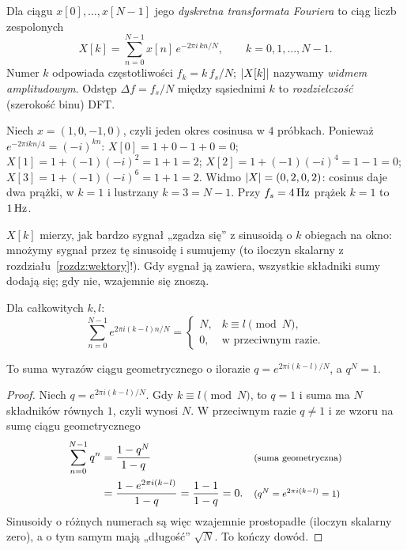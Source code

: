 \begin{definicja}[DFT]\label{def:dft}
Dla ciągu $x[0],\dots,x[N-1]$ jego \emph{dyskretna transformata Fouriera} to ciąg liczb zespolonych
\begin{equation}
  X[k]=\sum_{n=0}^{N-1}x[n]\,e^{-2\pi i\,kn/N},\qquad k=0,1,\dots,N-1.
  \label{eq:dft}
\end{equation}
Numer $k$ odpowiada częstotliwości $f_k=k\,f_s/N$; $\left\lvert X[k]\right\rvert$ nazywamy \emph{widmem amplitudowym}.
Odstęp $\Delta f=f_s/N$ między sąsiednimi $k$ to \emph{rozdzielczość} (szerokość binu) DFT.
\end{definicja}

\begin{przyklad}[$N=4$ ręcznie]\label{prz:dft4}
Niech $x=(1,0,-1,0)$, czyli jeden okres cosinusa w $4$ próbkach. Ponieważ $e^{-2\pi ikn/4}=(-i)^{kn}$:
$X[0]=1+0-1+0=0$; $X[1]=1+(-1)(-i)^{2}=1+1=2$; $X[2]=1+(-1)(-i)^{4}=1-1=0$; $X[3]=1+(-1)(-i)^{6}=1+1=2$.
Widmo $\left\lvert X\right\rvert=(0,2,0,2)$: cosinus daje dwa prążki, w $k=1$ i lustrzany $k=3=N-1$. Przy $f_s=4\,\mathrm{Hz}$ prążek $k=1$ to $1\,\mathrm{Hz}$.
\end{przyklad}

\begin{intuicja}
$X[k]$ mierzy, jak bardzo sygnał „zgadza się” z sinusoidą o $k$ obiegach na okno: mnożymy sygnał przez tę sinusoidę i
sumujemy (to iloczyn skalarny z rozdziału~\ref{rozdz:wektory}!). Gdy sygnał ją zawiera, wszystkie składniki sumy dodają się;
gdy nie, wzajemnie się znoszą.
\end{intuicja}

\begin{twierdzenie}\label{tw:ortogonalnosc}
Dla całkowitych $k,l$:
\begin{equation}
  \sum_{n=0}^{N-1}e^{2\pi i(k-l)n/N}=\begin{cases}N,&k\equiv l\pmod N,\\0,&\text{w przeciwnym razie.}\end{cases}
\end{equation}
\end{twierdzenie}
\begin{pomyslDowodu}
To suma wyrazów ciągu geometrycznego o ilorazie $q=e^{2\pi i(k-l)/N}$, a $q^N=1$.
\end{pomyslDowodu}
\begin{proof}
Niech $q=e^{2\pi i(k-l)/N}$. Gdy $k\equiv l\pmod N$, to $q=1$ i suma ma $N$ składników równych $1$, czyli wynosi $N$.
W przeciwnym razie $q\neq1$ i ze wzoru na sumę ciągu geometrycznego
\begin{align*}
\sum_{n=0}^{N-1}q^n &= \frac{1-q^N}{1-q} && \text{\footnotesize (suma geometryczna)}\\
 &= \frac{1-e^{2\pi i(k-l)}}{1-q}=\frac{1-1}{1-q}=0. && \text{\footnotesize ($q^N=e^{2\pi i(k-l)}=1$)}
\end{align*}
Sinusoidy o różnych numerach są więc wzajemnie prostopadłe (iloczyn skalarny zero), a o tym samym mają „długość” $\sqrt N$. To kończy dowód.
\end{proof}

